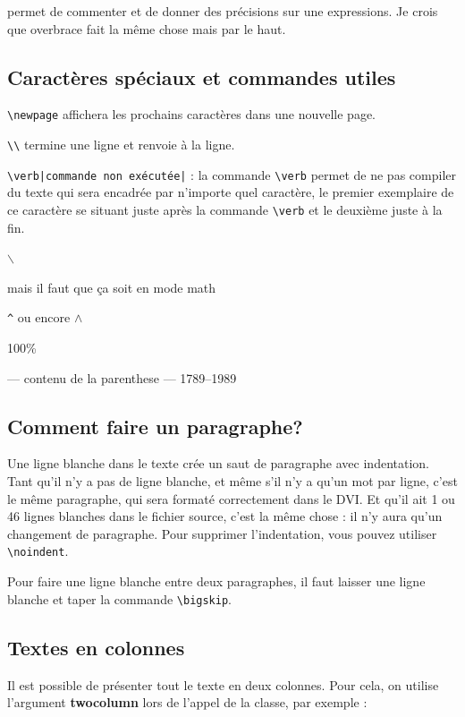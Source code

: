 \documentclass[a4paper,twoside]{article}
\begin{document}
permet de commenter et de donner des précisions sur une expressions. Je crois que overbrace fait la même chose mais par le haut.

\subsection{Caractères spéciaux et commandes utiles}
\verb|\newpage| affichera les prochains caractères dans une nouvelle page.

\verb|\\| termine une ligne et renvoie à la ligne.

\verb#\verb|commande non exécutée|# : la commande \verb|\verb| permet de ne pas compiler du texte qui sera encadrée par n'importe quel caractère, le premier exemplaire de ce caractère se situant juste après la commande \verb|\verb| et le deuxième juste à la fin.

\begin{example}
\(\backslash\)
\end{example}
mais il faut que ça soit en mode math

\begin{example}
\verb|^| ou encore \(\wedge\)
\end{example}

\begin{example}
100\%
\end{example}

\begin{example}
--- contenu de la parenthese ---
1789--1989
\end{example}

\subsection{Comment faire un paragraphe?}

Une ligne blanche dans le texte crée un saut de paragraphe avec indentation. Tant qu'il n'y a pas de ligne blanche, et même s'il n'y a qu'un mot par ligne, c'est le même paragraphe, qui sera formaté correctement dans le DVI. Et qu'il ait 1 ou 46 lignes blanches dans le fichier source, c'est la même chose : il n'y aura qu'un changement de paragraphe. Pour supprimer l'indentation, vous pouvez utiliser \verb|\noindent|.

Pour faire une ligne blanche entre deux paragraphes, il faut laisser une ligne blanche et taper la commande \verb|\bigskip|.

\subsection{Textes en colonnes}
Il est possible de présenter tout le texte en deux colonnes. Pour cela, on utilise l'argument \textbf{twocolumn} lors de l'appel de la classe, par exemple :
\end{document}
